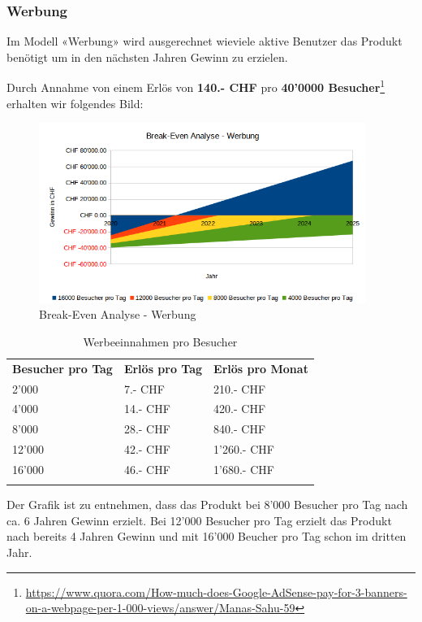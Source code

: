 \subsubsection{Werbung}\label{break-even-analyse-werbung}

Im Modell «Werbung» wird ausgerechnet wieviele aktive Benutzer das Produkt benötigt
um in den nächsten Jahren Gewinn zu erzielen.

Durch Annahme von einem Erlös von \textbf{140.- CHF} pro \textbf{40'0000 Besucher}\footnote{\url{https://www.quora.com/How-much-does-Google-AdSense-pay-for-3-banners-on-a-webpage-per-1-000-views/answer/Manas-Sahu-59}} erhalten wir folgendes Bild:

\begin{figure}[!htb]
  \centering
  \includegraphics[width=0.95\textwidth]{initialisierung/wirtschaftlichkeit-werbung.png}
  \caption{Break-Even Analyse - Werbung}
\end{figure}

\begin{longtable}[]{@{}lll@{}}
  \toprule
  \textbf{Besucher pro Tag} & \textbf{Erlös pro Tag} & \textbf{Erlös pro Monat}\tabularnewline
  2'000                     & 7.- CHF                & 210.- CHF\tabularnewline
  4'000                     & 14.- CHF               & 420.- CHF\tabularnewline
  8'000                     & 28.- CHF               & 840.- CHF\tabularnewline
  12'000                    & 42.- CHF               & 1'260.- CHF\tabularnewline
  16'000                    & 46.- CHF               & 1'680.- CHF\tabularnewline
  \bottomrule
  \caption{Werbeeinnahmen pro Besucher}
\end{longtable}

Der Grafik ist zu entnehmen, dass das Produkt bei 8'000 Besucher pro Tag nach ca. 6 Jahren Gewinn erzielt. Bei 12'000 Besucher pro Tag erzielt das Produkt nach bereits 4 Jahren Gewinn und mit 16'000 Beucher pro Tag schon im dritten Jahr.
